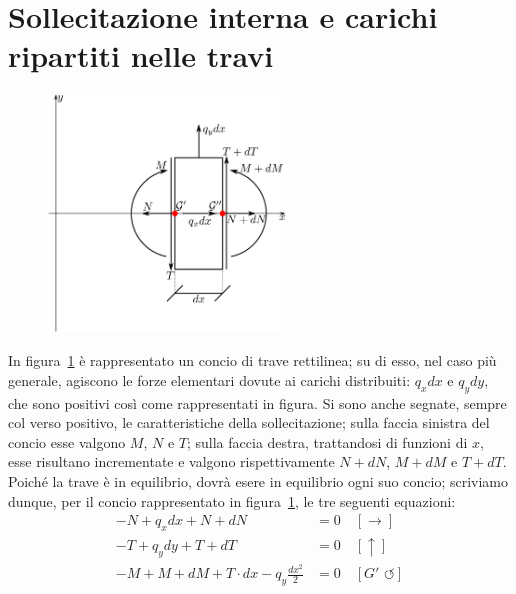 \section{Sollecitazione interna e carichi ripartiti nelle travi}
\renewcommand{\thefigure}{12~-~4}
\begin{figure}[ht]
\centering
\includegraphics[width=0.562\textwidth]{Immagini/Parte_12/Figura12_4/figura12_4.pdf}
\caption{}
\label{figura12-4}
\end{figure}
In figura~\ref{figura12-4} è rappresentato un concio di trave rettilinea; su di esso, nel caso più generale, agiscono le forze elementari dovute ai carichi distribuiti: $q_{x}dx$ e $q_{y}dy$, che sono positivi così come rappresentati in figura. Si sono anche segnate, sempre col verso positivo, le caratteristiche della sollecitazione; sulla faccia sinistra del concio esse valgono $M$, $N$ e $T$; sulla faccia destra, trattandosi di funzioni di $x$, esse risultano incrementate e valgono rispettivamente $N+dN$, $M+dM$ e $T+dT$. Poiché la trave è in equilibrio, dovrà esere in equilibrio ogni suo concio; scriviamo dunque, per il concio rappresentato in figura~\ref{figura12-4}, le tre seguenti equazioni:
\begin{subequations}
\begin{align} 
- N + q_{x}dx + N + dN &= 0 \quad [\rightarrow] \label{equazione12-4a} \tag{12.4a} \\
- T + q_{y}dy + T + dT &= 0 \quad [\uparrow] \label{equazione12-4b} \tag{12.4b} \\
- M + M + dM + T\cdot dx - q_{y}\frac{dx^2}{2} &= 0 \quad [G'\,\, \circlearrowleft] \label{equazione12-4c} \tag{12.4c} \\
\end{align}
\end{subequations}
